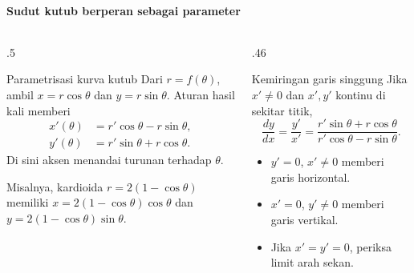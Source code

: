 \documentclass{../../kalkulus-ppt}
\begin{document}
\begin{frame}{\insertsection}
    \framesubtitle{Sudut kutub berperan sebagai parameter}
    \begin{columns}[T,onlytextwidth]
        \begin{column}{.5\textwidth}
            \begin{block}{Parametrisasi kurva kutub}
                Dari $r=f(\theta)$, ambil
                $x=r\cos\theta$ dan $y=r\sin\theta$.
                Aturan hasil kali memberi
                \[
                    \begin{aligned}
                        x'(\theta)&=r'\cos\theta-r\sin\theta,\\
                        y'(\theta)&=r'\sin\theta+r\cos\theta.
                    \end{aligned}
                \]
                Di sini aksen menandai turunan terhadap $\theta$.
            \end{block}
            Misalnya, kardioida $r=2(1-\cos\theta)$
            memiliki $x=2(1-\cos\theta)\cos\theta$ dan
            $y=2(1-\cos\theta)\sin\theta$.
        \end{column}
        \begin{column}{.46\textwidth}
            \begin{block}{Kemiringan garis singgung}
                Jika $x'\ne0$ dan $x',y'$ kontinu di sekitar titik,
                \[
                    \frac{dy}{dx}=\frac{y'}{x'}
                    =\frac{r'\sin\theta+r\cos\theta}
                          {r'\cos\theta-r\sin\theta}.
                \]
            \end{block}
            \begin{itemize}
                \item $y'=0$, $x'\ne0$ memberi garis horizontal.
                \item $x'=0$, $y'\ne0$ memberi garis vertikal.
                \item Jika $x'=y'=0$, periksa limit arah sekan.
            \end{itemize}
        \end{column}
    \end{columns}
\end{frame}
\end{document}
